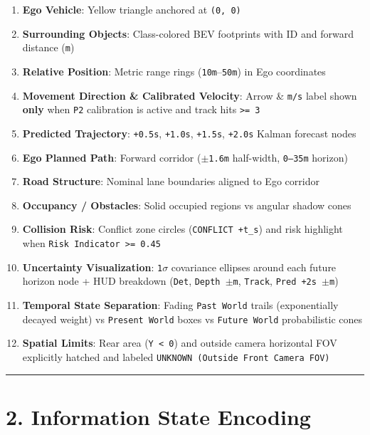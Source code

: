 \documentclass[10.5pt,a4paper]{article}
\begin{document}
\begin{enumerate}[leftmargin=1.8em,itemsep=2pt]
\item \textbf{Ego Vehicle}: Yellow triangle anchored at \texttt{(0,\allowbreak{} 0)}
\item \textbf{Surrounding Objects}: Class-colored BEV footprints with ID and forward distance (\texttt{m})
\item \textbf{Relative Position}: Metric range rings (\texttt{10m}--\texttt{50m}) in Ego coordinates
\item \textbf{Movement Direction \& Calibrated Velocity}: Arrow \& \texttt{m/\allowbreak{}s} label shown \textbf{only} when \texttt{P2} calibration is active and track hits \texttt{>= 3}
\item \textbf{Predicted Trajectory}: \texttt{+0.\allowbreak{}5s}, \texttt{+1.\allowbreak{}0s}, \texttt{+1.\allowbreak{}5s}, \texttt{+2.\allowbreak{}0s} Kalman forecast nodes
\item \textbf{Ego Planned Path}: Forward corridor (\texttt{$\pm$1.\allowbreak{}6m} half-width, \texttt{0--35m} horizon)
\item \textbf{Road Structure}: Nominal lane boundaries aligned to Ego corridor
\item \textbf{Occupancy / Obstacles}: Solid occupied regions vs angular shadow cones
\item \textbf{Collision Risk}: Conflict zone circles (\texttt{CONFLICT +t\_\allowbreak{}s}) and risk highlight when \texttt{Risk Indicator >= 0.\allowbreak{}45}
\item \textbf{Uncertainty Visualization}: \texttt{1$\sigma$} covariance ellipses around each future horizon node + HUD breakdown (\texttt{Det}, \texttt{Depth $\pm$m}, \texttt{Track}, \texttt{Pred +2s $\pm$m})
\item \textbf{Temporal State Separation}: Fading \texttt{Past World} trails (exponentially decayed weight) vs \texttt{Present World} boxes vs \texttt{Future World} probabilistic cones
\item \textbf{Spatial Limits}: Rear area (\texttt{Y < 0}) and outside camera horizontal FOV explicitly hatched and labeled \texttt{UNKNOWN (Outside Front Camera FOV)}
\end{enumerate}

\par\noindent\rule{\textwidth}{0.4pt}\par\medskip

\section{2. Information State Encoding}
\end{document}
